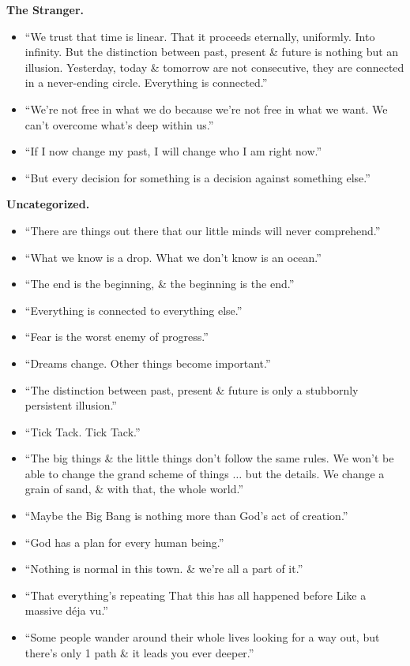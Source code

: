 \documentclass{article}
\begin{document}
\begin{enumerate}
\begin{itemize}
	\end{itemize}
	{\bf The Stranger.}
	\begin{itemize}
		\item ``We trust that time is linear. That it proceeds eternally, uniformly. Into infinity. But the distinction between past, present \& future is nothing but an illusion. Yesterday, today \& tomorrow are not consecutive, they are connected in a never-ending circle. Everything is connected.''
		\item ``We're not free in what we do because we're not free in what we want. We can't overcome what's deep within us.''
		\item ``If I now change my past, I will change who I am right now.''
		\item ``But every decision for something is a decision against something else.''
	\end{itemize}
	{\bf Uncategorized.}
	\begin{itemize}
		\item ``There are things out there that our little minds will never comprehend.''
		\item ``What we know is a drop. What we don't know is an ocean.''
		\item ``The end is the beginning, \& the beginning is the end.''
		\item ``Everything is connected to everything else.''
		\item ``Fear is the worst enemy of progress.''
		\item ``Dreams change. Other things become important.''
		\item ``The distinction between past, present \& future is only a stubbornly persistent illusion.''
		\item ``Tick Tack. Tick Tack.''
		\item ``The big things \& the little things don't follow the same rules. We won't be able to change the grand scheme of things $\ldots$ but the details. We change a grain of sand, \& with that, the whole world.''
		\item ``Maybe the Big Bang is nothing more than God's act of creation.''
		\item ``God has a plan for every human being.''
		\item ``Nothing is normal in this town. \& we're all a part of it.''
		\item ``That everything's repeating That this has all happened before Like a massive d\'eja vu.''
		\item ``Some people wander around their whole lives looking for a way out, but there's only 1 path \& it leads you ever deeper.''

\end{itemize}
\end{enumerate}
\end{document}
